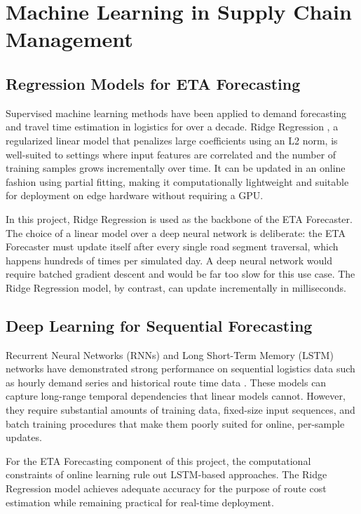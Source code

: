 \section{Machine Learning in Supply Chain Management}

\subsection{Regression Models for ETA Forecasting}

Supervised machine learning methods have been applied to demand forecasting and
travel time estimation in logistics for over a decade. Ridge Regression
\cite{hoerl1970}, a regularized linear model that penalizes large coefficients
using an L2 norm, is well-suited to settings where input features are correlated
and the number of training samples grows incrementally over time. It can be
updated in an online fashion using partial fitting, making it computationally
lightweight and suitable for deployment on edge hardware without requiring a GPU.

In this project, Ridge Regression is used as the backbone of the ETA Forecaster.
The choice of a linear model over a deep neural network is deliberate: the ETA
Forecaster must update itself after every single road segment traversal, which
happens hundreds of times per simulated day. A deep neural network would require
batched gradient descent and would be far too slow for this use case. The Ridge
Regression model, by contrast, can update incrementally in milliseconds.

\subsection{Deep Learning for Sequential Forecasting}

Recurrent Neural Networks (RNNs) and Long Short-Term Memory (LSTM) networks have
demonstrated strong performance on sequential logistics data such as hourly demand
series and historical route time data \cite{sutton2018}. These models can capture
long-range temporal dependencies that linear models cannot. However, they require
substantial amounts of training data, fixed-size input sequences, and batch
training procedures that make them poorly suited for online, per-sample updates.

For the ETA Forecasting component of this project, the computational constraints
of online learning rule out LSTM-based approaches. The Ridge Regression model
achieves adequate accuracy for the purpose of route cost estimation while
remaining practical for real-time deployment.

